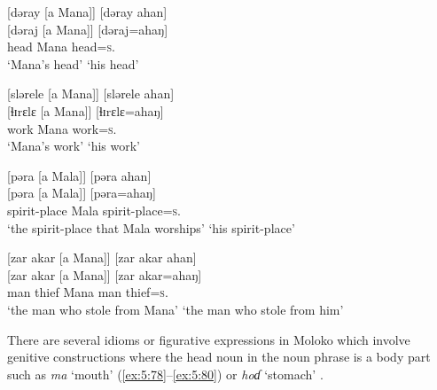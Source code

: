 \ea \label{ex:5:74}
{}[dəray  [a  Mana]]  \hspace{35pt}       [dəray  ahan]\\
\gll  {}[dəraj   [a   Mana]]    \hspace{25pt}   [dəraj=ahaŋ]\\
      head   {\GEN}  Mana   \hspace{30pt}    head=\textsc{s}.{\POSS}\\
\glt  ‘Mana’s head’   \hspace{50pt}      ‘his head’
\z

\ea \label{ex:5:75}
{}[slərele  [a  Mana]]   \hspace{32pt}      [slərele    ahan]\\
\gll  {}[ɬɪrɛlɛ   [a   Mana]]   \hspace{30pt}    [ɬɪrɛlɛ=ahaŋ]\\
      work   {\GEN}  Mana   \hspace{30pt}    work=\textsc{s}.{\POSS}\\
\glt  ‘Mana’s work’   \hspace{50pt}      ‘his work’
\z

\ea \label{ex:5:76}
{}[pəra  [a  Mala]]   \hspace{100pt}      [pəra  ahan]\\
\gll  {}[pəra   [a  Mala]]  \hspace{65pt}     [pəra=ahaŋ]\\
      spirit-place   {\GEN}   Mala   \hspace{65pt}              spirit-place=\textsc{s}.{\POSS}\\
\glt  ‘the spirit-place that Mala worships’  \hspace{5pt}   ‘his spirit-place’
\z

\ea \label{ex:5:77}
{}[zar  akar  [a  Mana]]  \hspace{62pt}     [zar  akar  ahan]\\
\gll  {}[zar   akar   [a   Mana]]  \hspace{50pt}   [zar   akar=ahaŋ]\\
      man   thief   {\GEN}   Mana   \hspace{50pt}       man  thief=\textsc{s}.{\POSS}\\
\glt  ‘the man who stole from Mana’ \hspace{10pt}    ‘the man who stole from him’
\z

There are several idioms or figurative expressions in Moloko which involve genitive constructions where the head noun in the noun phrase is a body part such as \textit{ma} ‘mouth’ (\ref{ex:5:78}--\ref{ex:5:80}) or \textit{hoɗ}  ‘stomach’ . 

